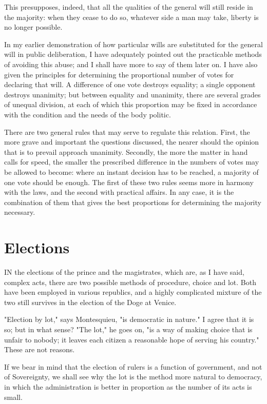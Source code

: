 \documentclass[12pt]{report}
\begin{document}
This presupposes, indeed, that all the qualities of the general will still reside in the majority: when they cease to do so, whatever side a man may take, liberty is no longer possible.

In my earlier demonstration of how particular wills are substituted for the general will in public deliberation, I have adequately pointed out the practicable methods of avoiding this abuse; and I shall have more to say of them later on. I have also given the principles for determining the proportional number of votes for declaring that will. A difference of one vote destroys equality; a single opponent destroys unanimity; but between equality and unanimity, there are several grades of unequal division, at each of which this proportion may be fixed in accordance with the condition and the needs of the body politic.

There are two general rules that may serve to regulate this relation. First, the more grave and important the questions discussed, the nearer should the opinion that is to prevail approach unanimity. Secondly, the more the matter in hand calls for speed, the smaller the prescribed difference in the numbers of votes may be allowed to become: where an instant decision has to be reached, a majority of one vote should be enough. The first of these two rules seems more in harmony with the laws, and the second with practical affairs. In any case, it is the combination of them that gives the best proportions for determining the majority necessary.

\section{Elections}
IN the elections of the prince and the magistrates, which are, as I have said, complex acts, there are two possible methods of procedure, choice and lot. Both have been employed in various republics, and a highly complicated mixture of the two still survives in the election of the Doge at Venice.

"Election by lot," says Montesquieu, "is democratic in nature." I agree that it is so; but in what sense? "The lot," he goes on, "is a way of making choice that is unfair to nobody; it leaves each citizen a reasonable hope of serving his country." These are not reasons.

If we bear in mind that the election of rulers is a function of government, and not of Sovereignty, we shall see why the lot is the method more natural to democracy, in which the administration is better in proportion as the number of its acts is small.
\end{document}
